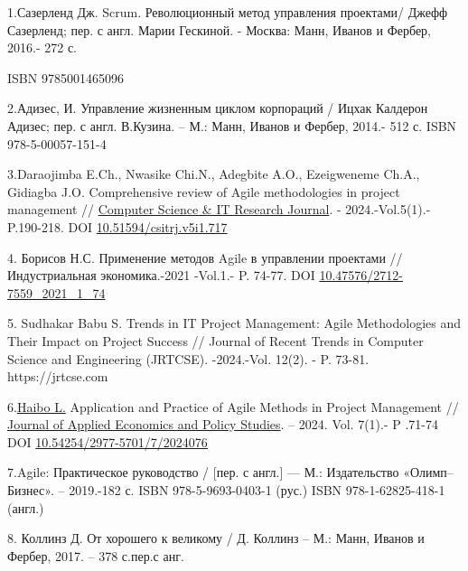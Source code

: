   \begin{references}
1.Сазерленд Дж. Scrum. Революционный метод управления проектами/ Джефф
Сазерленд; пер. с англ. Марии Гескиной. - Москва: Манн, Иванов и Фербер,
2016.- 272 с.

ISBN 9785001465096

2.Адизес, И. Управление жизненным циклом корпораций / Ицхак Калдерон
Адизес; пер. с англ. В.Кузина. -- М.: Манн, Иванов и Фербер, 2014.- 512
с. ISBN 978-5-00057-151-4

3.Daraojimba E.Ch., Nwasike Chi.N., Adegbite A.O., Ezeigweneme Ch.A.,
Gidiagba J.O. Comprehensive review of Agile methodologies in project
management //
\href{https://www.researchgate.net/journal/Computer-Science-IT-Research-Journal-2709-0051?_tp=eyJjb250ZXh0Ijp7ImZpcnN0UGFnZSI6Il9kaXJlY3QiLCJwYWdlIjoicHVibGljYXRpb24iLCJwcmV2aW91c1BhZ2UiOiJfZGlyZWN0In19}{Computer
Science \& IT Research Journal}. - 2024.-Vol.5(1).- P.190-218. DOI
\href{http://dx.doi.org/10.51594/csitrj.v5i1.717}{10.51594/csitrj.v5i1.717}

4. Борисов Н.С. Применение методов Agile в управлении проектами //
Индустриальная экономика.-2021 -Vol.1.- P. 74-77. DOI
\href{https://doi.org/10.47576/2712-7559_2021_1_74}{10.47576/2712-7559\_2021\_1\_74}

5. Sudhakar Babu S. Trends in IT Project Management: Agile Methodologies
and Their Impact on Project Success // Journal of Recent Trends in
Computer Science and Engineering (JRTCSE). -2024.-Vol. 12(2). - P.
73-81. https://jrtcse.com

6.\href{https://www.researchgate.net/scientific-contributions/Haibo-Li-2290691805?_tp=eyJjb250ZXh0Ijp7ImZpcnN0UGFnZSI6Il9kaXJlY3QiLCJwYWdlIjoicHVibGljYXRpb24iLCJwcmV2aW91c1BhZ2UiOiJfZGlyZWN0In19}{Haibo
L.} Application and Practice of Agile Methods in Project Management //
\href{https://www.researchgate.net/journal/Journal-of-Applied-Economics-and-Policy-Studies-2977-571X?_tp=eyJjb250ZXh0Ijp7ImZpcnN0UGFnZSI6Il9kaXJlY3QiLCJwYWdlIjoicHVibGljYXRpb24iLCJwcmV2aW91c1BhZ2UiOiJfZGlyZWN0In19}{Journal
of Applied Economics and Policy Studies}. -- 2024. Vol. 7(1).- P .71-74
DOI
\href{http://dx.doi.org/10.54254/2977-5701/7/2024076}{10.54254/2977-5701/7/2024076}

7.Agile: Практическое руководство / {[}пер. с англ.{]} --- М.:
Издательство «Олимп--Бизнес». -- 2019.-182 с. ISBN 978-5-9693-0403-1
(рус.) ISBN 978-1-62825-418-1 (англ.)

8. Коллинз Д. От хорошего к великому / Д. Коллинз -- М.: Манн, Иванов и
Фербер, 2017. -- 378 с.пер.с анг.


\end{references}
